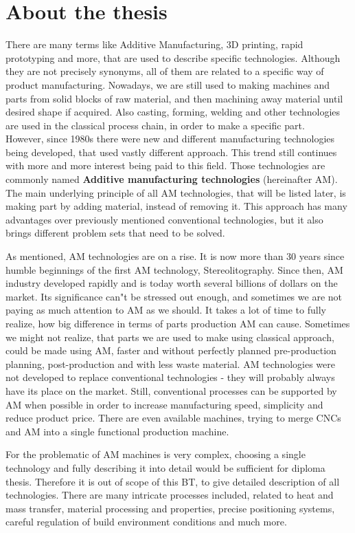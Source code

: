 \documentclass[a4paper, twoside, 11pt]{report}
\begin{document}
\section{About the thesis}
There are many terms like Additive Manufacturing, 3D printing, rapid prototyping and more, that are used to describe specific technologies. Although they are not precisely synonyms, all of them are related to a specific way of product manufacturing. Nowadays, we are still used to making machines and parts from solid blocks of raw material, and then machining away material until desired shape if acquired. Also casting, forming, welding and other technologies are used in the classical process chain, in order to make a specific part.\\
However, since 1980s there were new and different manufacturing technologies being developed, that used vastly different approach. This trend still continues with more and more interest being paid to this field. Those technologies are commonly named \textbf{Additive manufacturing technologies} (hereinafter AM). The main underlying principle of all AM technologies, that will be listed later, is making part by adding material, instead of removing it. This approach has many advantages over previously mentioned conventional technologies, but it also brings different problem sets that need to be solved.

	As mentioned, AM technologies are on a rise. It is now more than 30 years since humble beginnings of the first AM technology, Stereolitography. Since then, AM industry developed rapidly and is today worth several billions of dollars on the market. Its significance can"t be stressed out enough, and sometimes we are not paying as much attention to AM as we should. It takes a lot of time to fully realize, how big difference in terms of parts production AM can cause. Sometimes we might not realize, that parts we are used to make using classical approach, could be made using AM, faster and without perfectly planned pre-production planning, post-production and with less waste material. AM technologies were not developed to replace conventional technologies - they will probably always have its place on the market. Still, conventional processes can be supported by AM when possible in order to increase manufacturing speed, simplicity and reduce product price. There are even available machines, trying to merge CNCs and AM into a single functional production machine.
	
	For the problematic of AM machines is very complex, choosing a single technology and fully describing it into detail would be sufficient for diploma thesis. Therefore it is out of scope of this BT, to give detailed description of all technologies. There are many intricate processes included, related to heat and mass transfer, material processing and properties, precise positioning systems, careful regulation of build environment conditions and much more.
	
\end{document}
